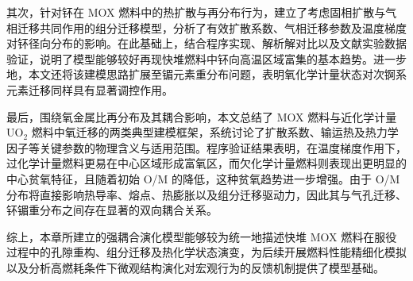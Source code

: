 其次，针对钚在 MOX 燃料中的热扩散与再分布行为，建立了考虑固相扩散与气相迁移共同作用的组分迁移模型，分析了有效扩散系数、气相迁移参数及温度梯度对钚径向分布的影响。在此基础上，结合程序实现、解析解对比以及文献实验数据验证，说明了模型能够较好再现快堆燃料中钚向高温区域富集的基本趋势。进一步地，本文还将该建模思路扩展至镅元素重分布问题，表明氧化学计量状态对次锕系元素迁移同样具有显著调控作用。

最后，围绕氧金属比再分布及其耦合影响，本文总结了 MOX 燃料与近化学计量 UO$_2$ 燃料中氧迁移的两类典型建模框架，系统讨论了扩散系数、输运热及热力学因子等关键参数的物理含义与适用范围。程序验证结果表明，在温度梯度作用下，过化学计量燃料更易在中心区域形成富氧区，而欠化学计量燃料则表现出更明显的中心贫氧特征，且随着初始 O/M 的降低，这种贫氧趋势进一步增强。由于 O/M 分布将直接影响热导率、熔点、热膨胀以及组分迁移驱动力，因此其与气孔迁移、钚镅重分布之间存在显著的双向耦合关系。

综上，本章所建立的强耦合演化模型能够较为统一地描述快堆 MOX 燃料在服役过程中的孔隙重构、组分迁移及热化学状态演变，为后续开展燃料性能精细化模拟以及分析高燃耗条件下微观结构演化对宏观行为的反馈机制提供了模型基础。
